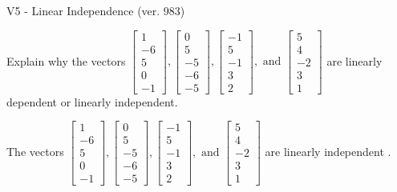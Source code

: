 \begin{exercise}
  \begin{exerciseTitle}V5 - Linear Independence (ver. 983)\end{exerciseTitle}
  \begin{exerciseStatement}
    Explain why the vectors \(\left[\begin{array}{r}
1 \\
-6 \\
5 \\
0 \\
-1
\end{array}\right] , \left[\begin{array}{r}
0 \\
5 \\
-5 \\
-6 \\
-5
\end{array}\right] , \left[\begin{array}{r}
-1 \\
5 \\
-1 \\
3 \\
2
\end{array}\right] , \text{ and } \left[\begin{array}{r}
5 \\
4 \\
-2 \\
3 \\
1
\end{array}\right]\) are linearly dependent or linearly independent.	


  \end{exerciseStatement}
  \begin{exerciseAnswer}
   The vectors \(\left[\begin{array}{r}
1 \\
-6 \\
5 \\
0 \\
-1
\end{array}\right] , \left[\begin{array}{r}
0 \\
5 \\
-5 \\
-6 \\
-5
\end{array}\right] , \left[\begin{array}{r}
-1 \\
5 \\
-1 \\
3 \\
2
\end{array}\right] , \text{ and } \left[\begin{array}{r}
5 \\
4 \\
-2 \\
3 \\
1
\end{array}\right]\) are 
  	 linearly independent  .
  


  \end{exerciseAnswer}
\end{exercise}
